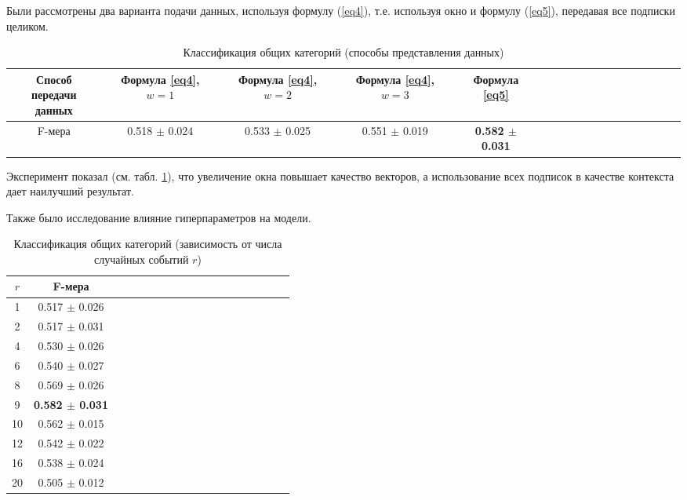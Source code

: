 \documentclass[times,specification,annotation]{itmo-student-thesis}
\begin{document}
Были рассмотрены два варианта подачи данных, используя формулу (\ref{eq4}), т.е. используя окно и формулу (\ref{eq5}), передавая все подписки целиком. 

\begin{table}[!h]
\caption{Классификация общих категорий (способы представления данных)}\label{tab-cmp-w}
\centering
\begin{tabular}{|*{18}{c|}}\hline
 \thead{Способ \\ передачи данных} &  \thead{Формула \ref{eq4},\\ $w  = 1$}  &  \thead{Формула \ref{eq4},\\ $w  = 2$}  &  \thead{Формула \ref{eq4},\\ $w  = 3$} & Формула \ref{eq5}   \\\hline
F-мера    &  0.518 $\pm$ 0.024 & 0.533 $\pm$ 0.025  &  0.551 $\pm$ 0.019 & \textbf{0.582 $\pm$ 0.031} \\\hline
\end{tabular}
\end{table}

Эксперимент показал (см. табл. \ref{tab-cmp-w}), что увеличение окна повышает качество векторов, а использование всех подписок в качестве контекста дает наилучший результат.

Также было исследование влияние гиперпараметров на модели.  

\begin{table}[!h]
\caption{Классификация общих категорий (зависимость от числа случайных событий $r$)}\label{tab-cmp-r}
\centering
\begin{tabular}{|*{18}{c|}}\hline
$r$ &  F-мера   \\\hline
1 &  0.517 $\pm$ 0.026\\\hline
2 &  0.517 $\pm$ 0.031 \\\hline
4 &  0.530 $\pm$ 0.026 \\\hline
6 &  0.540 $\pm$ 0.027 \\\hline
8 &  0.569 $\pm$ 0.026 \\\hline
9 &  \textbf{0.582 $\pm$ 0.031} \\\hline
10 &  0.562 $\pm$ 0.015 \\\hline
12 &  0.542 $\pm$ 0.022 \\\hline
16 &  0.538 $\pm$ 0.024 \\\hline
20 &  0.505 $\pm$ 0.012 \\\hline
\end{tabular}
\end{table}
\end{document}
